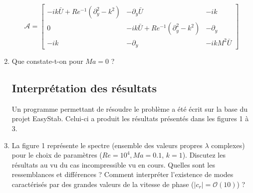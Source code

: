 \documentclass[a4paper,11pt]{article}
\begin{document}
\begin{enumerate}
{$$
{\mathcal A} = 
\left[
\begin{array}{ccc} 
-i k \bar{U} + Re^{-1} ( \partial_y^2 - k^2) & - \partial_y \bar{U} & - i k \\ 
0 & -i k \bar{U} + Re^{-1} ( \partial_y^2 - k^2) & - \partial_y \\
-i k  & -\partial_y  & -i k M^2 \bar{U}
\end{array} 
\right] 
$$
}

\item Que constate-t-on pour $Ma=0$ ?








\subsection{ Interprétation des résultats  }

Un programme permettant de résoudre le problème a été écrit sur la base du projet EasyStab. Celui-ci a produit les résultats présentés dans les figures 1 à 3.

\item La figure 1 représente le spectre (ensemble des valeurs propres $\lambda$ complexes) pour le choix de paramètres ($Re = 10^4, Ma=0.1$, $k=1$). Discutez les résultats au vu du cas incompressible vu en cours. Quelles sont les ressemblances et différences ? Comment interpréter l'existence de modes caractérisés par des grandes valeurs de la vitesse de phase ($|c_r| = \mathcal{O} (10)$) ?

\end{enumerate}
\end{document}
